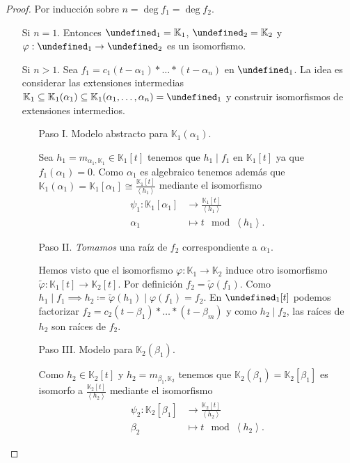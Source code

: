 \documentclass[10pt, spanish]{report}
\theoremstyle{definition}
\newcommand{\K}{\mathbb{K}}
\let\L\undefined
\newcommand{\L}{\mathbb{L}}
\begin{document}
\begin{proof}
    Por inducción sobre $n=\deg{f_1}=\deg{f_2}$.
    \begin{itemize}[itemindent=30pt]
        \item[Si $n=1$.] Entonces $\L_1=\K_1$, $\L_2=\K_2$ y $\varphi:\L_1\to
            \L_2$ es un isomorfismo.
        \item[Si $n>1$.] Sea $f_1=c_1(t-\alpha_1)*\ldots*(t-\alpha_n)$ en
            $\L_1$. La idea es considerar las extensiones intermedias
            $\K_1\subseteq\K_1(\alpha_1)\subseteq\K_1(\alpha_1,\ldots,\alpha_n)=\L_1$
            y construir isomorfismos de extensiones intermedios.
            \begin{enumerate}[itemindent=24pt]
                \item[Paso I.] Modelo abstracto para $\K_1(\alpha_1)$.

                    Sea $h_1=m_{\alpha_1,\K_1}\in\K_1[t]$ tenemos que
                    $h_1\mid f_1$ en $\K_1[t]$ ya que $f_1(\alpha_1)=0$.
                    Como $\alpha_1$ es algebraico tenemos además que
                    $\K_1(\alpha_1)=\K_1[\alpha_1]\cong
                    \frac{\K_1[t]}{\left<h_1\right>}$ mediante el isomorfismo
                    \begin{align*}
                        \psi_1: \K_1[\alpha_1]&\to \frac{\K_1[t]}{\left< h_1
                        \right>}\\
                            \alpha_1&\mapsto t\mod\left<h_1\right>.
                    \end{align*}
                \item[Paso II.] \textit{Tomamos} una raíz de $f_2$
                    correspondiente a $\alpha_1$.

                    Hemos visto que el isomorfismo $\varphi:\K_1\to \K_2$ induce
                    otro isomorfismo $\tilde{\varphi}:\K_1[t]\to\K_2[t]$. Por
                    definición $f_2=\tilde{\varphi}(f_1)$. Como $h_1\mid
                    f_1\implies
                    h_2\coloneqq\tilde{\varphi}(h_1)\mid\varphi(f_1)=f_2$. En
                    $\L_1[t]$ podemos factorizar
                    $f_2=c_2(t-\beta_1)*\ldots*(t-\beta_m)$ y como $h_2\mid
                    f_2$, las raíces de $h_2$ son raíces de $f_2$.
                \item[Paso III.] Modelo para $\K_2(\beta_1)$.

                    Como $h_2\in\K_2[t]$  y $h_2=m_{\beta_1,\K_2}$ tenemos que
                    $\K_2(\beta_1)=\K_2[\beta_1]$ es isomorfo a
                    $\frac{\K_2[t]}{\left< h_2 \right> }$ mediante el
                    isomorfismo
                    \begin{align*}
                        \psi_2: \K_2[\beta_1]&\to \frac{\K_2[t]}{\left< h_2
                        \right>}\\
                            \beta_2&\mapsto t\mod\left<h_2\right>.
                    \end{align*}


\end{enumerate}
\end{itemize}
\end{proof}
\end{document}
